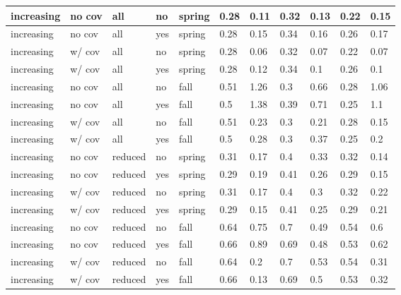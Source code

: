 \documentclass[
  12pt,
]{article}
\begin{document}
\begin{table}
\begin{tabular}[t]{l|l|l|l|l|l|l|l|l|l|l}
\hline
increasing & no cov & all & no & spring & 0.28 & 0.11 & 0.32 & 0.13 & 0.22 & 0.15\\
\hline
increasing & no cov & all & yes & spring & 0.28 & 0.15 & 0.34 & 0.16 & 0.26 & 0.17\\
\hline
increasing & w/ cov & all & no & spring & 0.28 & 0.06 & 0.32 & 0.07 & 0.22 & 0.07\\
\hline
increasing & w/ cov & all & yes & spring & 0.28 & 0.12 & 0.34 & 0.1 & 0.26 & 0.1\\
\hline
increasing & no cov & all & no & fall & 0.51 & 1.26 & 0.3 & 0.66 & 0.28 & 1.06\\
\hline
increasing & no cov & all & yes & fall & 0.5 & 1.38 & 0.39 & 0.71 & 0.25 & 1.1\\
\hline
increasing & w/ cov & all & no & fall & 0.51 & 0.23 & 0.3 & 0.21 & 0.28 & 0.15\\
\hline
increasing & w/ cov & all & yes & fall & 0.5 & 0.28 & 0.3 & 0.37 & 0.25 & 0.2\\
\hline
increasing & no cov & reduced & no & spring & 0.31 & 0.17 & 0.4 & 0.33 & 0.32 & 0.14\\
\hline
increasing & no cov & reduced & yes & spring & 0.29 & 0.19 & 0.41 & 0.26 & 0.29 & 0.15\\
\hline
increasing & w/ cov & reduced & no & spring & 0.31 & 0.17 & 0.4 & 0.3 & 0.32 & 0.22\\
\hline
increasing & w/ cov & reduced & yes & spring & 0.29 & 0.15 & 0.41 & 0.25 & 0.29 & 0.21\\
\hline
increasing & no cov & reduced & no & fall & 0.64 & 0.75 & 0.7 & 0.49 & 0.54 & 0.6\\
\hline
increasing & no cov & reduced & yes & fall & 0.66 & 0.89 & 0.69 & 0.48 & 0.53 & 0.62\\
\hline
increasing & w/ cov & reduced & no & fall & 0.64 & 0.2 & 0.7 & 0.53 & 0.54 & 0.31\\
\hline
increasing & w/ cov & reduced & yes & fall & 0.66 & 0.13 & 0.69 & 0.5 & 0.53 & 0.32\\
\hline
\end{tabular}
\end{table}
\end{document}
